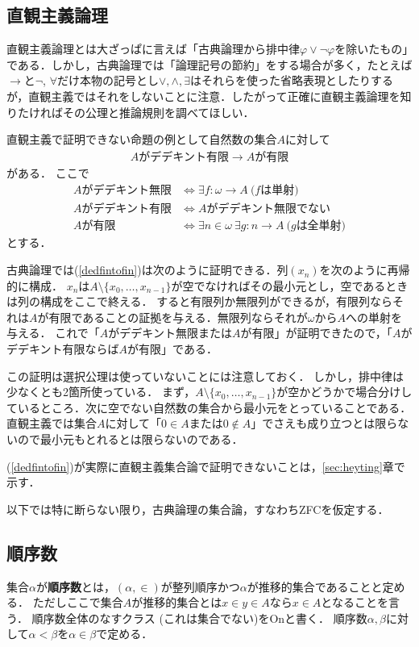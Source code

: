 \documentclass[uplatex,dvipdfmx]{jsarticle}
\newcommand{\Ordinals}{\mathrm{On}}
\theoremstyle{definition}
\begin{document}
\subsection{直観主義論理}

直観主義論理とは大ざっぱに言えば「古典論理から排中律$\varphi \lor \neg \varphi$を除いたもの」である．しかし，古典論理では「論理記号の節約」をする場合が多く，たとえば$\to$と$\neg$, $\forall$だけ本物の記号とし$\lor, \land, \exists$はそれらを使った省略表現としたりするが，直観主義ではそれをしないことに注意．したがって正確に直観主義論理を知りたければその公理と推論規則を調べてほしい．

直観主義で証明できない命題の例として自然数の集合$A$に対して
\begin{align}\label{dedfintofin}
\text{$A$がデデキント有限} \to \text{$A$が有限} \tag{*}
\end{align}
がある．
ここで
\begin{align*}
\text{$A$がデデキント無限} &\iff \exists f: \omega \to A\ \text{($f$は単射)} \\
\text{$A$がデデキント有限} &\iff \text{$A$がデデキント無限でない} \\
\text{$A$が有限} &\iff \exists n \in \omega\ \exists g: n \to A\ \text{($g$は全単射)}
\end{align*}
とする．

古典論理では(\ref{dedfintofin})は次のように証明できる．列$(x_n)$を次のように再帰的に構成．
$x_n$は$A \setminus \{x_0, \dots, x_{n-1} \}$が空でなければその最小元とし，空であるときは列の構成をここで終える．
すると有限列か無限列ができるが，有限列ならそれは$A$が有限であることの証拠を与える．無限列ならそれが$\omega$から$A$への単射を与える．
これで「$A$がデデキント無限または$A$が有限」が証明できたので，「$A$がデデキント有限ならば$A$が有限」である．

この証明は選択公理は使っていないことには注意しておく．
しかし，排中律は少なくとも2箇所使っている．
まず，$A \setminus \{x_0, \dots, x_{n-1} \}$が空かどうかで場合分けしているところ．次に空でない自然数の集合から最小元をとっていることである．直観主義では集合$A$に対して「$0 \in A$または$0 \not \in A$」でさえも成り立つとは限らないので最小元もとれるとは限らないのである．

(\ref{dedfintofin})が実際に直観主義集合論で証明できないことは，\ref{sec:heyting}章で示す．

以下では特に断らない限り，古典論理の集合論，すなわちZFCを仮定する．

\subsection{順序数}
集合$\alpha$が{\bfseries 順序数}とは，$(\alpha, \in)$が整列順序かつ$\alpha$が推移的集合であることと定める．
ただしここで集合$A$が推移的集合とは$x \in y \in A$なら$x \in A$となることを言う．
順序数全体のなすクラス (これは集合でない)を$\Ordinals$と書く．
順序数$\alpha, \beta$に対して$\alpha < \beta$を$\alpha \in \beta$で定める．
\end{document}
